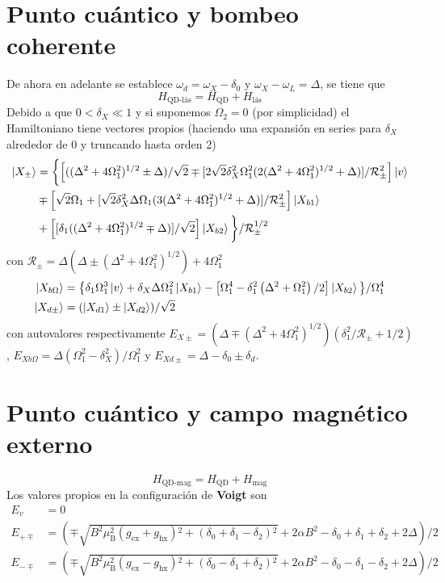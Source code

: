\documentclass[main.tex]{subfiles}
\begin{document}
\section{Punto cuántico y bombeo coherente}
De ahora en adelante se establece $\omega_d = \omega_X - \delta_0$ y $\omega_X - \omega_L = \Delta$, se tiene que
$$H_\text{QD-l\'as} = H_\text{QD} + H_\text{l\'as}$$
Debido a que $0<\delta_X \ll 1$ y si suponemos $\Omega_2 = 0$ (por simplicidad) el Hamiltoniano tiene vectores propios (haciendo una expansión en series para $\delta_X$ alrededor de 0 y truncando hasta orden 2)
\begin{align*}
  \ket{X_\pm} &= \bigg\{\Big[((\Delta ^2+4 \Omega _1^2)^{1/2} \pm \Delta)/\sqrt{2} \mp [2 \sqrt{2} \delta_X^2 \Omega_1^2 (2(\Delta ^2+4 \Omega _1^2)^{1/2}+\Delta)]/\mathcal{R}_\pm^2\Big]\ket{v}\\ 
   &\mp \Big[\sqrt{2} \Omega_1 + [\sqrt{2} \delta_X^2 \Delta  \Omega _1 (3(\Delta ^2 + 4 \Omega_1^2)^{1/2}+\Delta)]/\mathcal{R}_\pm^2 \Big]\ket{X_{b1}}\\ 
   &+ \Big[[\delta _1 ((\Delta^2 + 4\Omega_1^2)^{1/2} \mp \Delta)]/\sqrt{2}\Big]\ket{X_{b2}} \bigg\}/\mathcal{R}_\pm^{1/2}
\end{align*}
con $\mathcal{R}_\pm = \Delta  (\Delta \pm (\Delta ^2+4 \Omega _1^2)^{1/2})+4 \Omega _1^2$
\begin{align*}
   \ket{X_{b\Omega}} &= \big\{ \delta _1 \Omega_1^3 \ket{v} + \delta_X \Delta \Omega_1^2 \ket{X_{b1}} - \big[\Omega_1^4 - \delta _1^2 \left(\Delta ^2+\Omega _1^2\right)/2 \big]\ket{X_{b2}} \big\} /\Omega_1^4\\
   \ket{X_{d\pm}} &= (\ket{X_{d1}} \pm \ket{X_{d2}})/\sqrt{2}
\end{align*}
con autovalores respectivamente $E_{X\pm} = (\Delta \mp (\Delta^2 + 4\Omega_1^2)^{1/2})(\delta _1^2/\mathcal{R}_\pm + 1/2)$, $E_{Xb\Omega} = \Delta(\Omega_1^2 - \delta_X^2)/\Omega_1^2$ y $E_{Xd\pm} = \Delta - \delta_0 \pm \delta_d$.
\section{Punto cuántico y campo magnético externo}
\begin{equation*}
    H_\text{QD-mag} = H_\text{QD} + H_\text{mag}
\end{equation*}
Los valores propios en la configuración de \textbf{Voigt} son
\begin{align*}
    E_v &= 0\\
    E_{+\mp} &= \left(\mp\sqrt{B^2 \mu _{\text{B}}^2 \left(g_{\text{ex}}+g_{\text{hx}}\right){}^2+\left(\delta _0+\delta _1-\delta _2\right){}^2}+2 \alpha  B^2-\delta _0+\delta _1+\delta _2+2 \Delta \right)/2\\
    E_{-\mp} &= \left(\mp\sqrt{B^2 \mu _{\text{B}}^2 \left(g_{\text{ex}}-g_{\text{hx}}\right){}^2+\left(\delta _0-\delta _1+\delta _2\right){}^2}+2 \alpha  B^2-\delta _0-\delta _1-\delta _2+2 \Delta \right)/2
\end{align*}
\end{document}

